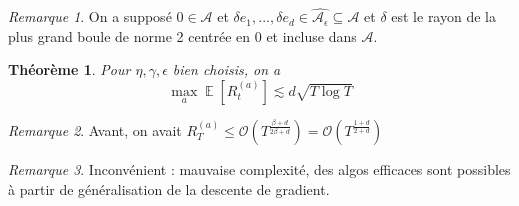 \documentclass{article}
\DeclareMathOperator*{\E}{\mathbb{E}}
\newtheorem{theorem}{Théorème}[section]
\theoremstyle{remark}
\theoremstyle{remark}
\newtheorem{remark}{Remarque}[section]
\begin{document}
\begin{remark}
   On a supposé $0 \in \mathcal{A}$ et $\delta e_1, ..., \delta e_d \in \widehat{\mathcal{A}_\epsilon} \subseteq \mathcal{A}$  et $\delta$ est le rayon de la plus grand boule de norme 2 centrée en 0 et incluse dans $\mathcal{A}$.
\end{remark}

\begin{theorem}
   Pour $\eta, \gamma, \epsilon$ bien choisis, on a
   $$
   \max_{a} \E[R_t^{(a)}] \lesssim d \sqrt{T \log T}
   $$
\end{theorem}

\begin{remark}
   Avant, on avait $R_T^{(a)} \leq \mathcal{O}(T^{\frac{\beta + d}{2 \beta + d}}) = \mathcal{O}(T^{\frac{1+d}{2+d}})$
\end{remark}
\begin{remark}
   Inconvénient : mauvaise complexité, des algos efficaces sont possibles à partir de généralisation de la descente de gradient.
\end{remark}
\end{document}
